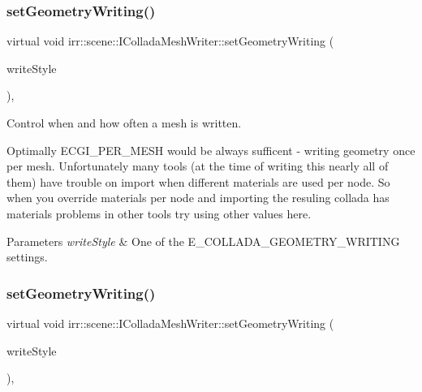 \subsubsection{\texorpdfstring{set\+Geometry\+Writing()}{setGeometryWriting()}\hspace{0.1cm}{\footnotesize\ttfamily [1/2]}}
{\footnotesize\ttfamily virtual void irr\+::scene\+::\+I\+Collada\+Mesh\+Writer\+::set\+Geometry\+Writing (\begin{DoxyParamCaption}\item[{\hyperlink{namespaceirr_1_1scene_a179008e7c02889459edf81394dbd6959}{E\+\_\+\+C\+O\+L\+L\+A\+D\+A\+\_\+\+G\+E\+O\+M\+E\+T\+R\+Y\+\_\+\+W\+R\+I\+T\+I\+NG}}]{write\+Style }\end{DoxyParamCaption})\hspace{0.3cm}{\ttfamily [inline]}, {\ttfamily [virtual]}}



Control when and how often a mesh is written. 

Optimally E\+C\+G\+I\+\_\+\+P\+E\+R\+\_\+\+M\+E\+SH would be always sufficent -\/ writing geometry once per mesh. Unfortunately many tools (at the time of writing this nearly all of them) have trouble on import when different materials are used per node. So when you override materials per node and importing the resuling collada has materials problems in other tools try using other values here. 
\begin{DoxyParams}{Parameters}
{\em write\+Style} & One of the E\+\_\+\+C\+O\+L\+L\+A\+D\+A\+\_\+\+G\+E\+O\+M\+E\+T\+R\+Y\+\_\+\+W\+R\+I\+T\+I\+NG settings. \\
\hline
\end{DoxyParams}
\mbox{\label{classirr_1_1scene_1_1IColladaMeshWriter_a25d2e1ff0bf04375c822800b0b3a4b01}} 
\subsubsection{\texorpdfstring{set\+Geometry\+Writing()}{setGeometryWriting()}\hspace{0.1cm}{\footnotesize\ttfamily [2/2]}}
{\footnotesize\ttfamily virtual void irr\+::scene\+::\+I\+Collada\+Mesh\+Writer\+::set\+Geometry\+Writing (\begin{DoxyParamCaption}\item[{\hyperlink{namespaceirr_1_1scene_a179008e7c02889459edf81394dbd6959}{E\+\_\+\+C\+O\+L\+L\+A\+D\+A\+\_\+\+G\+E\+O\+M\+E\+T\+R\+Y\+\_\+\+W\+R\+I\+T\+I\+NG}}]{write\+Style }\end{DoxyParamCaption})\hspace{0.3cm}{\ttfamily [inline]}, {\ttfamily [virtual]}}



